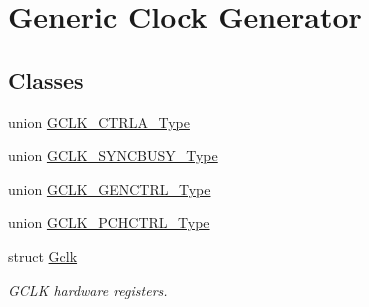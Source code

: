 \hypertarget{group___s_a_m_l21___g_c_l_k}{}\section{Generic Clock Generator}
\label{group___s_a_m_l21___g_c_l_k}
\subsection*{Classes}
\begin{DoxyCompactItemize}
\item 
union \hyperlink{union_g_c_l_k___c_t_r_l_a___type}{G\+C\+L\+K\+\_\+\+C\+T\+R\+L\+A\+\_\+\+Type}
\item 
union \hyperlink{union_g_c_l_k___s_y_n_c_b_u_s_y___type}{G\+C\+L\+K\+\_\+\+S\+Y\+N\+C\+B\+U\+S\+Y\+\_\+\+Type}
\item 
union \hyperlink{union_g_c_l_k___g_e_n_c_t_r_l___type}{G\+C\+L\+K\+\_\+\+G\+E\+N\+C\+T\+R\+L\+\_\+\+Type}
\item 
union \hyperlink{union_g_c_l_k___p_c_h_c_t_r_l___type}{G\+C\+L\+K\+\_\+\+P\+C\+H\+C\+T\+R\+L\+\_\+\+Type}
\item 
struct \hyperlink{struct_gclk}{Gclk}
\begin{DoxyCompactList}\small\item\em G\+C\+L\+K hardware registers. \end{DoxyCompactList}\end{DoxyCompactItemize}
